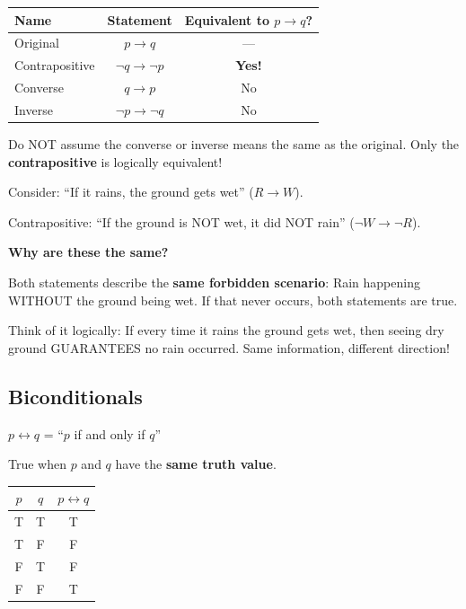 \documentclass[11pt,a4paper]{article}
\begin{document}
\begin{center}
\begin{tabular}{l|c|c}
\toprule
\textbf{Name} & \textbf{Statement} & \textbf{Equivalent to $p \to q$?} \\
\midrule
Original & $p \to q$ & --- \\
Contrapositive & $\neg q \to \neg p$ & \textbf{Yes!} \\
Converse & $q \to p$ & No \\
Inverse & $\neg p \to \neg q$ & No \\
\bottomrule
\end{tabular}
\end{center}

\begin{warningbox}
Do NOT assume the converse or inverse means the same as the original. Only the \textbf{contrapositive} is logically equivalent!
\end{warningbox}

\begin{tipbox}
Consider: ``If it rains, the ground gets wet'' ($R \to W$).

Contrapositive: ``If the ground is NOT wet, it did NOT rain'' ($\neg W \to \neg R$).

\textbf{Why are these the same?}

Both statements describe the \textbf{same forbidden scenario}: Rain happening WITHOUT the ground being wet. If that never occurs, both statements are true.

Think of it logically: If every time it rains the ground gets wet, then seeing dry ground GUARANTEES no rain occurred. Same information, different direction!
\end{tipbox}

\subsection{Biconditionals}

\begin{definitionbox}
$p \leftrightarrow q$ = ``$p$ if and only if $q$''

True when $p$ and $q$ have the \textbf{same truth value}.
\end{definitionbox}

\begin{center}
\begin{tabular}{cc|c}
\toprule
$p$ & $q$ & $p \leftrightarrow q$ \\
\midrule
T & T & T \\
T & F & F \\
F & T & F \\
F & F & T \\
\bottomrule
\end{tabular}
\end{center}
\end{document}
